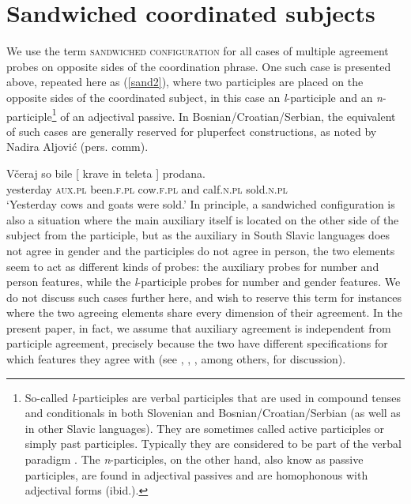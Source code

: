 \documentclass[output=paper
,modfonts
,nonflat]{langsci/langscibook}
\begin{document}
\section{Sandwiched coordinated subjects}\label{sec:sandwconf}

We use the term \textsc{sandwiched configuration} for all cases of multiple agreement probes on opposite sides of the coordination phrase. One such case is presented above, repeated here as (\ref{sand2}), where two participles are placed on the opposite sides of the coordinated subject, in this case an \textit{l}-participle and an \textit{n}-participle\footnote{So-called \textit{l}-participles are verbal participles that are used in compound tenses and conditionals in both Slovenian and Bosnian/Croatian/Serbian (as well as in other Slavic languages). They are sometimes called active participles or simply past participles. Typically they are considered to be part of the verbal paradigm \citep{browne:93,priestly:93}. The \textit{n}-participles, on the other hand, also know as passive participles, are found in adjectival passives and are homophonous with adjectival forms (ibid.).} of an adjectival passive. In Bosnian/Croatian/Serbian, the equivalent of such cases are generally reserved for pluperfect constructions, as noted by Nadira Aljović (pers. comm).

\ea \label{sand2}
\gll Včeraj      so    bile       [ krave    in    teleta ]    prodana.\\
yesterday \textsc{aux.pl} been.\textsc{f.pl} {} cow.\textsc{f.pl} and calf.\textsc{n.pl} {}   sold.\textsc{n.pl} \\
\glt `Yesterday cows and goats were sold.'
\z
In principle, a sandwiched configuration is also a situation where the main auxiliary itself is located on the other side of the subject from the participle, but as the auxiliary in South Slavic languages does not agree in gender and the participles do not agree in person, the two elements seem to act as different kinds of probes: the auxiliary probes for number and person features, while the \textit{l}-participle probes for number and gender features. We do not discuss such cases  further here, and wish to reserve this term for instances where the two agreeing elements share every dimension of their agreement. In the present paper, in fact, we assume that auxiliary agreement is independent from participle agreement, precisely because the two have different specifications for which features they agree with (see \citealt{dalessandro:07}, \citealt{lopez:07}, \citealt{puskar:17}, among others, for discussion).
\end{document}
